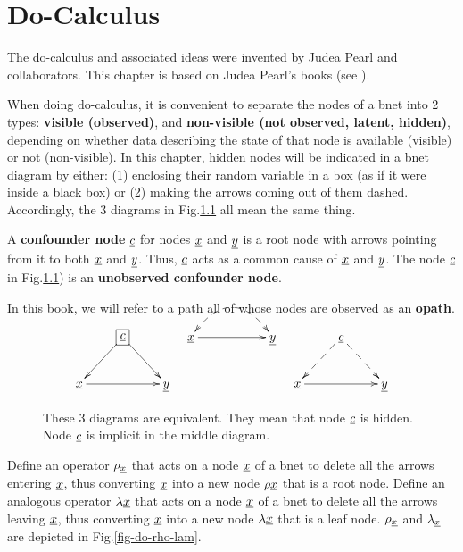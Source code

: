 \chapter{Do-Calculus}\label{ch-do-calc}


The do-calculus and associated ideas were
invented by
Judea Pearl and collaborators.
This chapter is 
based on Judea Pearl's
books (see ).


When
doing
do-calculus,
it is 
convenient
to separate
the nodes
of a bnet
into
2  types:
{\bf visible (observed)},
and {\bf non-visible (not observed, latent,
hidden)},
depending
on
whether data
describing
the
state 
of that
node
is available 
(visible) or not (non-visible).
In this chapter, hidden nodes will 
be indicated 
in a bnet
diagram by
either: (1)
enclosing
their random variable
in a box (as
if it were inside a black box) or
(2) making
the arrows
coming
out of them
dashed.
Accordingly, 
the 
3 diagrams 
in
Fig.\ref{fig-hidden-dashes}
all mean the same thing.

A {\bf confounder node} ${\underline{c}}$
for nodes ${\underline{x}}$ and ${\underline{y}}$
is a root node
with arrows
pointing
from it to
both
${\underline{x}}$ and ${\underline{y}}$.
Thus, ${\underline{c}}$ acts as a common cause
of ${\underline{x}}$ and ${\underline{y}}$.
The node
${\underline{c}}$
in Fig.\ref{fig-hidden-dashes})
is an {\bf unobserved confounder node}.

In this book,
we will refer
to a path
all of whose nodes are
observed as an {\bf opath}.



\begin{figure}[h!]
$$\xymatrix{
&*+[F]{\rvc}\ar[dl]\ar[dr]
\\
\rvx\ar[rr]&&\rvy
}
\;\;\;
\xymatrix{
\rvx\ar@{-->}@{<-->}@/^2pc/[rr]
\ar[rr]&&\rvy
}
\;\;\;
\xymatrix{
&\rvc\ar@{-->}[dl]\ar@{-->}[dr]
\\
\rvx\ar[rr]&&\rvy
}$$
\caption{
These 3 diagrams
are equivalent.
They
mean that node ${\underline{c}}$
is hidden.
Node ${\underline{c}}$
is implicit
in the
middle diagram.}
\label{fig-hidden-dashes}
\end{figure}



Define
an
operator
$\rho_{\underline{x}}$
that acts on
a node
${\underline{x}}$
of a bnet
to
delete
all
the 
arrows
entering
${\underline{x}}$,
thus
converting
${\underline{x}}$
into
a new
node $\rho {\underline{x}}$
that
is a root node.
Define 
an analogous 
operator
$\lambda{\underline{x}}$
that acts on
a node
${\underline{x}}$
of a bnet
to
delete
all
the 
arrows
leaving
${\underline{x}}$,
thus
converting
${\underline{x}}$
into
a new
node $\lambda {\underline{x}}$
that
is a leaf node.
$\rho_{\underline{x}}$
and
$\lambda_{\underline{x}}$
are
depicted
in Fig.\ref{fig-do-rho-lam}.



